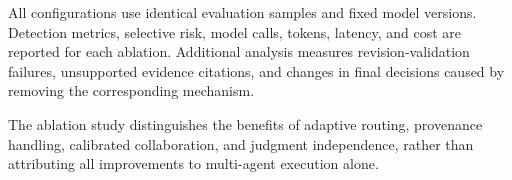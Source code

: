 All configurations use identical
evaluation samples and fixed model
versions. Detection metrics,
selective risk, model calls,
tokens, latency, and cost are
reported for each ablation.
Additional analysis measures
revision-validation failures,
unsupported evidence citations,
and changes in final decisions
caused by removing the corresponding
mechanism.

The ablation study distinguishes
the benefits of adaptive routing,
provenance handling, calibrated
collaboration, and judgment
independence, rather than attributing
all improvements to multi-agent
execution alone.




